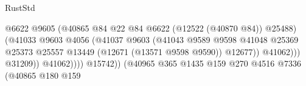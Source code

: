 \begin{lexlean}{RustStd}
\begin{coremodule}
                                                                @6622
                                                                @9605
                                                                (@40865
                                                                  @84
                                                                  @22
                                                                  @84
                                                                  @6622
                                                                  (@12522 (@40870 @84))
                                                                  @25488)
                                                                (@41033
                                                                  @9603
                                                                  @4056
                                                                  (@41037
                                                                    @9603
                                                                    (@41043
                                                                      @9589
                                                                      @9598
                                                                      @41048
                                                                      @25369
                                                                      @25373
                                                                      @25557
                                                                      @13449
                                                                      (@12671 (@13571 @9598 @9590))
                                                                      @12677))
                                                                  @41062)))
                                                            @31209))
                                                        @41062))))
                                                @15742))
                                            (@40965
                                              @365
                                              @1435
                                              @159
                                              @270
                                              @4516
                                              @7336
                                              (@40865
                                                @180
                                                @159

\end{coremodule}
\end{lexlean}
